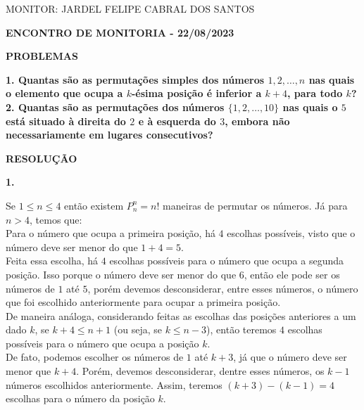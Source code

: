 \documentclass[12pt, a4paper]{article}
\begin{document}
\begin{flushleft}

MONITOR: JARDEL FELIPE CABRAL DOS SANTOS\\[1cm] 
\end{flushleft}

\begin{center} \textbf{ENCONTRO DE MONITORIA - 22/08/2023\\[1cm]}
\end{center}

\begin{center}
\textbf{PROBLEMAS}
\end{center}

\textbf{1. Quantas são as permutações simples dos números \(1, 2,\ldots , n\) nas quais o elemento que ocupa a \(k\)-ésima posição é inferior a \(k+ 4\), para todo \(k\)?} \\

\textbf{2. Quantas são as permutações dos números \(\{1, 2, \ldots, 10\}\) nas quais o \(5\) está situado à direita do \(2\) e à esquerda do \(3\), embora não necessariamente em lugares consecutivos?} 

\begin{center}
\textbf{RESOLUÇÃO}
\end{center}

\textbf{1.}


Se \(1 \leq n \leq 4\) então existem \(P^n_n = n!\) maneiras de permutar os números. Já para \(n > 4\), temos que: \\

Para o número que ocupa a primeira posição, há \(4\) escolhas possíveis, visto que o número deve ser menor do que \(1 + 4 =5\). \\

Feita essa escolha, há \(4\) escolhas possíveis para o número que ocupa a segunda posição. Isso porque o número deve ser menor do que \(6\), então ele pode ser os números de \(1\) até \(5\), porém devemos desconsiderar, entre esses números, o número que foi escolhido anteriormente para ocupar a primeira posição. \\

De maneira análoga, considerando feitas as escolhas das posições anteriores a um dado \(k \), se \(k+4 \leq n+1\) (ou seja, se \(k \leq n - 3\)), então teremos \(4\) escolhas possíveis para o número que ocupa a posição \(k\). \\

De fato, podemos escolher os números de \(1\) até \(k+3\), já que o número deve ser menor que \(k+4\). Porém, devemos desconsiderar, dentre esses números, os \(k-1\) números escolhidos anteriormente. Assim, teremos \((k+3)-(k-1) = 4\) escolhas para o número da posição \(k\). \\
\end{document}
